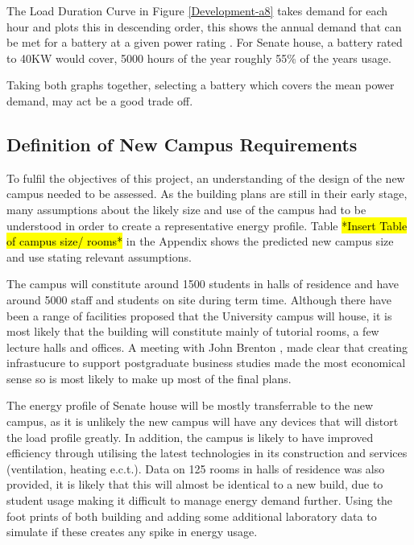 The Load Duration Curve in Figure \ref{Development-a8} takes demand for
each hour and plots this in descending order, this shows the annual
demand that can be met for a battery at a given power rating
\autocite{combined-heat-power-buildings}. For Senate house, a battery
rated to 40KW would cover, 5000 hours of the year roughly 55\% of the
years usage.

Taking both graphs together, selecting a battery which covers the mean
power demand, may act be a good trade off.

\subsection{Definition of New Campus
Requirements}\label{definition-of-new-campus-requirements}

To fulfil the objectives of this project, an understanding of the design
of the new campus needed to be assessed. As the building plans are still
in their early stage, many assumptions about the likely size and use of
the campus had to be understood in order to create a representative
energy profile. Table \hl{*Insert Table of campus size/ rooms*} in the
Appendix shows the predicted new campus size and use stating relevant
assumptions.

The campus will constitute around 1500 students in halls of residence
and have around 5000 staff and students on site during term time.
Although there have been a range of facilities proposed that the
University campus will house, it is most likely that the building will
constitute mainly of tutorial rooms, a few lecture halls and offices. A
meeting with John Brenton \autocite{Jbrentmeet}, made clear that
creating infrastucure to support postgraduate business studies made the
most economical sense so is most likely to make up most of the final
plans.

The energy profile of Senate house will be mostly transferrable to the
new campus, as it is unlikely the new campus will have any devices that
will distort the load profile greatly. In addition, the campus is likely
to have improved efficiency through utilising the latest technologies in
its construction and services (ventilation, heating e.c.t.). Data on 125
rooms in halls of residence was also provided, it is likely that this
will almost be identical to a new build, due to student usage making it
difficult to manage energy demand further. Using the foot prints of both
building and adding some additional laboratory data to simulate if these
creates any spike in energy usage.

